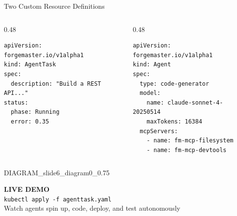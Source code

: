 \documentclass[aspectratio=169,14pt]{beamer}
\begin{document}
\begin{frame}[fragile]{Two Custom Resource Definitions}
\begin{columns}[T]
\begin{column}{0.48\textwidth}
\begin{lstlisting}[style=yaml]
apiVersion: forgemaster.io/v1alpha1
kind: AgentTask
spec:
  description: "Build a REST API..."
status:
  phase: Running
  error: 0.35
\end{lstlisting}
\end{column}
\begin{column}{0.48\textwidth}
\begin{lstlisting}[style=yaml]
apiVersion: forgemaster.io/v1alpha1
kind: Agent
spec:
  type: code-generator
  model:
    name: claude-sonnet-4-20250514
    maxTokens: 16384
  mcpServers:
    - name: fm-mcp-filesystem
    - name: fm-mcp-devtools
\end{lstlisting}
\end{column}
\end{columns}
\vspace{4pt}
{{DIAGRAM_slide6_diagram0_0.75}}
\end{frame}

{
\begin{frame}[plain]
\vfill
\begin{center}
{\Huge\bfseries\color{accent}LIVE DEMO}\\[20pt]
{\color{muted}\texttt{kubectl apply -f agenttask.yaml}}\\[12pt]
{\color{muted}Watch agents spin up, code, deploy, and test autonomously}
\end{center}
\vfill
\end{frame}
}
\end{document}
